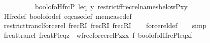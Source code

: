 \begin{isabellebody}
\ \ \ \ \ \ \ \ \ {\isacharequal}{\kern0pt}\ bool{\isacharunderscore}{\kern0pt}of{\isacharunderscore}{\kern0pt}o{\isacharparenleft}{\kern0pt}Hfrc{\isacharparenleft}{\kern0pt}P{\isacharcomma}{\kern0pt}\ leq{\isacharcomma}{\kern0pt}\ y{\isacharcomma}{\kern0pt}\ restrict{\isacharparenleft}{\kern0pt}f{\isacharcomma}{\kern0pt}{\isacharparenleft}{\kern0pt}frecrel{\isacharparenleft}{\kern0pt}names{\isacharunderscore}{\kern0pt}below{\isacharparenleft}{\kern0pt}P{\isacharcomma}{\kern0pt}x{\isacharparenright}{\kern0pt}{\isacharparenright}{\kern0pt}{\isacharcircum}{\kern0pt}{\isacharplus}{\kern0pt}{\isacharparenright}{\kern0pt}{\isacharminus}{\kern0pt}{\isacharbackquote}{\kern0pt}{\isacharbackquote}{\kern0pt}{\isacharbraceleft}{\kern0pt}y{\isacharbraceright}{\kern0pt}{\isacharparenright}{\kern0pt}{\isacharparenright}{\kern0pt}{\isacharparenright}{\kern0pt}{\isachardoublequoteclose}\isanewline
%
\isadelimproof
\ \ %
\endisadelimproof
%
\isatagproof
{}\isamarkupfalse%
\ Hfrc{\isacharunderscore}{\kern0pt}def\ bool{\isacharunderscore}{\kern0pt}of{\isacharunderscore}{\kern0pt}o{\isacharunderscore}{\kern0pt}def\ eq{\isacharunderscore}{\kern0pt}case{\isacharunderscore}{\kern0pt}def\ mem{\isacharunderscore}{\kern0pt}case{\isacharunderscore}{\kern0pt}def\isanewline
\ \ \isamarkupfalse%
\ restrict{\isacharunderscore}{\kern0pt}trancl{\isacharunderscore}{\kern0pt}forcerel\ frecRI{}\ frecRI{}\ frecRI{}\isanewline
\ \ \isamarkupfalse%
\ forcerel{\isacharunderscore}{\kern0pt}def\isanewline
\ \ \isamarkupfalse%
\ simp%
\endisatagproof
{\isafoldproof}%
%
\isadelimproof
\isanewline
%
\endisadelimproof
\isanewline
\isanewline
{}\isamarkupfalse%
\ frc{\isacharunderscore}{\kern0pt}at{\isacharunderscore}{\kern0pt}trancl{\isacharcolon}{\kern0pt}\ {\isachardoublequoteopen}frc{\isacharunderscore}{\kern0pt}at{\isacharparenleft}{\kern0pt}P{\isacharcomma}{\kern0pt}leq{\isacharcomma}{\kern0pt}z{\isacharparenright}{\kern0pt}\ {\isacharequal}{\kern0pt}\ wfrec{\isacharparenleft}{\kern0pt}forcerel{\isacharparenleft}{\kern0pt}P{\isacharcomma}{\kern0pt}z{\isacharparenright}{\kern0pt}{\isacharcomma}{\kern0pt}z{\isacharcomma}{\kern0pt}{\isasymlambda}x\ f{\isachardot}{\kern0pt}\ bool{\isacharunderscore}{\kern0pt}of{\isacharunderscore}{\kern0pt}o{\isacharparenleft}{\kern0pt}Hfrc{\isacharparenleft}{\kern0pt}P{\isacharcomma}{\kern0pt}leq{\isacharcomma}{\kern0pt}x{\isacharcomma}{\kern0pt}f{\isacharparenright}{\kern0pt}{\isacharparenright}{\kern0pt}{\isacharparenright}{\kern0pt}{\isachardoublequoteclose}\isanewline

\end{isabellebody}
